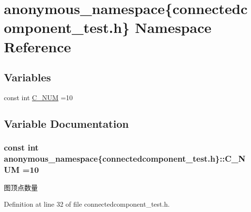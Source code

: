 \hypertarget{namespaceanonymous__namespace_02connectedcomponent__test_8h_03}{}\section{anonymous\+\_\+namespace\{connectedcomponent\+\_\+test.\+h\} Namespace Reference}
\label{namespaceanonymous__namespace_02connectedcomponent__test_8h_03}
\subsection*{Variables}
\begin{DoxyCompactItemize}
\item 
const int \hyperlink{namespaceanonymous__namespace_02connectedcomponent__test_8h_03_a7b2ff10fde75f8ca30157d6bd9c9444a}{C\+\_\+\+N\+U\+M} =10
\end{DoxyCompactItemize}


\subsection{Variable Documentation}
\hypertarget{namespaceanonymous__namespace_02connectedcomponent__test_8h_03_a7b2ff10fde75f8ca30157d6bd9c9444a}{}
\subsubsection[{C\+\_\+\+N\+U\+M}]{\setlength{\rightskip}{0pt plus 5cm}const int anonymous\+\_\+namespace\{connectedcomponent\+\_\+test.\+h\}\+::C\+\_\+\+N\+U\+M =10}\label{namespaceanonymous__namespace_02connectedcomponent__test_8h_03_a7b2ff10fde75f8ca30157d6bd9c9444a}
图顶点数量 

Definition at line 32 of file connectedcomponent\+\_\+test.\+h.


